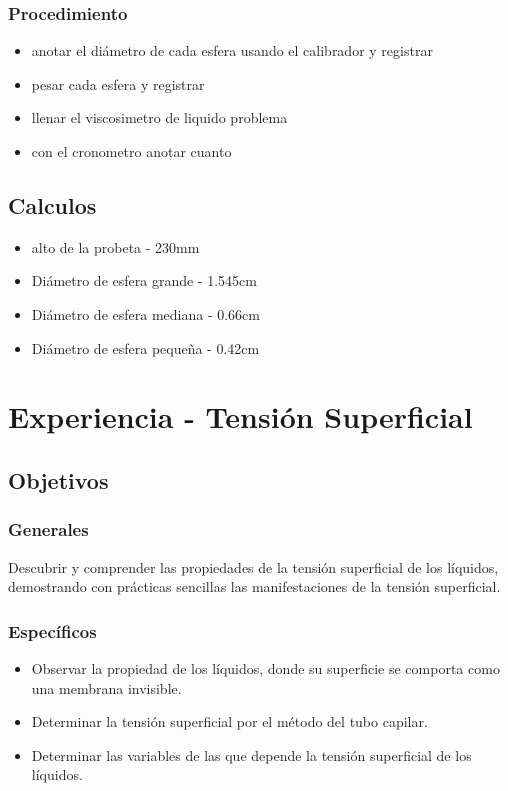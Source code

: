 \documentclass[11pt, letterpaper]{article}
\begin{document}
\subsubsection{Procedimiento}
\begin{itemize}
	\item anotar el diámetro de cada esfera usando el calibrador y registrar
	\item pesar cada esfera y registrar
	\item llenar el viscosimetro de liquido problema
	\item con el cronometro anotar cuanto
\end{itemize}
\subsection{Calculos}
\begin{itemize}
	\item alto de la probeta - 230mm
	\item Diámetro de esfera grande - 1.545cm
	\item Diámetro de esfera mediana - 0.66cm
	\item Diámetro de esfera pequeña - 0.42cm
\end{itemize}

\section{Experiencia - Tensión Superficial}
\subsection{Objetivos}
\subsubsection{Generales}
Descubrir y comprender las propiedades de la tensión superficial de los líquidos, demostrando con prácticas sencillas las manifestaciones de la tensión superficial.
\subsubsection{Específicos}
\begin{itemize}
	\item Observar la propiedad de los líquidos, donde su superficie se comporta como una membrana invisible.
	\item Determinar la tensión superficial por el método del tubo capilar.
	\item Determinar las variables de las que depende la tensión superficial de los líquidos.
\end{itemize}
\end{document}
